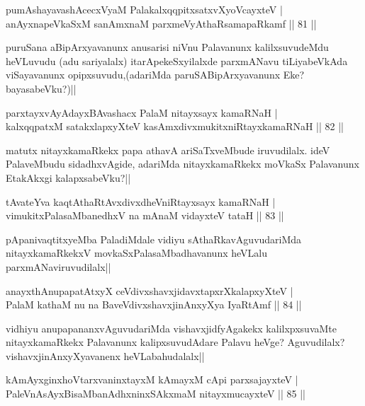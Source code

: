 \begin{shl}
pumAshayavashAcecxVyaM PalakalxqqpitxsatxvXyoVcayxteV |\\
anAyxnapeVkaSxM sanAmxnaM parxmeVyAthaRsamapaRkamf \hfill || 81 ||
\end{shl}

\begin{artha}
puruSana aBipArxyavanunx anusarisi niVnu Palavanunx kalilxsuvudeMdu heVLuvudu (adu 
sariyalalx) itarApekeSxyilalxde parxmANavu tiLiyabeVkAda viSayavanunx 
opipxsuvudu,(adariMda paruSABipArxyavanunx Eke?bayasabeVku?)||
\end{artha}

\begin{shl}
parxtayxvAyAdayxBAvashacx PalaM nitayxsayx kamaRNaH |\\
kalxqqpatxM satakxlapxyXteV kasAmxdivxmukitxniRtayxkamaRNaH \hfill || 82 ||
\end{shl}
	
\begin{artha}
matutx nitayxkamaRkekx papa athavA ariSaTxveMbude iruvudilalx. ideV PalaveMbudu sidadhxvAgide, adariMda nitayxkamaRkekx moVkaSx Palavanunx EtakAkxgi kalapxsabeVku?||
\end{artha}

\begin{shl}
tAvateYva kaqtAthaRtAvxdivxdheVniRtayxsayx kamaRNaH |\\
vimukitxPalasaMbanedhxV na mAnaM vidayxteV tataH \hfill || 83 ||
\end{shl}

\begin{artha}
pApanivaqtitxyeMba PaladiMdale vidiyu sAthaRkavAguvudariMda nitayxkamaRkekxV movkaSxPalasaMbadhavanunx heVLalu parxmANaviruvudilalx||
\end{artha}

\begin{shl}
anayxthA\s nupapatAtxyX ceVdivxshavxjidavxtapxrXkalapxyXteV |\\
PalaM kathaM nu na BaveVdivxshavxjinAnxyXya IyaRtAmf \hfill || 84 ||
\end{shl}

\begin{artha}
vidhiyu anupapananxvAguvudariMda vishavxjidfyAgakekx kalilxpxsuvaMte nitayxkamaRkekx Palavanunx kalipxsuvudAdare Palavu heVge? Aguvudilalx? vishavxjinAnxyXyavanenx heVLabahudalalx||
\end{artha}

\begin{shl}
kAmAyxginxhoVtarxvaninxtayxM kAmayxM cApi parxsajayxteV |\\
PaleVnAsAyxBisaMbanAdhxninxSAkxmaM nitayxmucayxteV \hfill || 85 ||
\end{shl}

